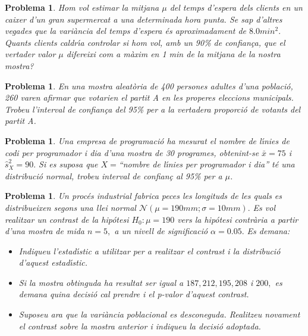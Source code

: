 \documentclass[11pt]{article}
\newcounter{prbcont}
\newtheorem{problema}[prbcont]{Problema}
\begin{document}
\begin{problema}
Hom vol estimar la mitjana $\mu$ del temps d'espera dels clients en un caixer d'un gran
supermercat a una determinada hora punta. Se sap d'altres vegades que la vari\`ancia
del temps d'espera \'es aproximadament de $8.0 min^2.$ Quants clients caldr\'{\i}a controlar
si hom vol, amb un 90\% de confian\c{c}a, que el vertader valor $\mu$ difereixi com a m\`axim
en 1 min de la mitjana de la nostra mostra? %
\end{problema}

\begin{problema}
En una mostra aleat\`oria de 400 persones adultes d'una poblaci\'o, 260 varen afirmar que
votarien el partit A en les properes eleccions municipals. Trobeu l'interval de confian\c{c}a
del 95\% per a la vertadera proporci\'o de votants del partit A. %
\end{problema}


\begin{problema}
Una empresa de programaci\'o ha mesurat el nombre de l\'{\i}nies de codi per programador
i dia d'una mostra de 30 programes, obtenint-se $\bar{x} = 75$ i $\hat{s}_X^2 = 90.$ Si es suposa
que $X=$``nombre de l\'{\i}nies per programador i dia'' t\'e una distribuci\'o normal, trobeu
interval de confian\c{c} al 95\% per a $\mu$.
\end{problema}





\begin{problema}
Un proc\'es industrial fabrica peces les longituds de les quals es distribueixen segons una
llei normal $\mathcal{N}(\mu = 190 mm; \sigma = 10 mm).$ Es vol realitzar un contrast de la hip\'otesi $H_0 : \mu = 190$ vers la hip\'otesi contr\`aria a partir d'una mostra de mida $n = 5,$ a un nivell de significaci\'o $\alpha = 0.05.$ Es demana:
\begin{itemize}
\item [(a)] Indiqueu l'estad\'{\i}stic a utilitzar per a realitzar el contrast i la distribuci\'o d'aquest estad\'{\i}stic.
\item [(b)] Si la mostra obtinguda ha resultat ser igual a $187, 212, 195, 208$ i $200,$ es demana
quina decisi\'o cal prendre i el p-valor d'aquest contrast. %
\item [(c)] Suposeu ara que la vari\`ancia poblacional es desconeguda. Realitzeu novament
el contrast sobre la mostra anterior i indiqueu la decisi\'o adoptada. %
\end{itemize}
\end{problema}
\end{document}
